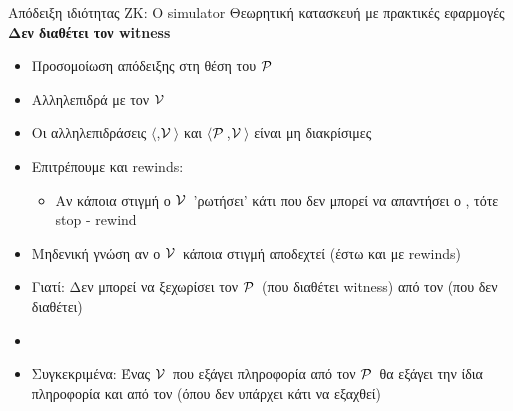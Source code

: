 \documentclass[10pt,handout]{beamer}
\begin{document}
\begin{frame}{Απόδειξη ιδιότητας ΖΚ: Ο simulator}
{Θεωρητική κατασκευή με πρακτικές εφαρμογές}
\textbf{Δεν διαθέτει τον witness}
\pause
\begin{small}
\begin{itemize}
\setlength\itemsep{0.01em}
\item Προσομοίωση απόδειξης στη θέση του $\mathcal{P}\,$ 
\item Αλληλεπιδρά με τον $\mathcal{V}\,$
\pause
\item Οι αλληλεπιδράσεις $\langle$\siml,$\mathcal{V}\,$$\rangle$ και $\langle$$\mathcal{P}\,$,$\mathcal{V}\,$$\rangle$ είναι μη διακρίσιμες
\pause
\item Επιτρέπουμε και rewinds:
\pause
\begin{itemize}
\item Αν κάποια στιγμή ο $\mathcal{V}\,$ 'ρωτήσει' κάτι που δεν μπορεί να απαντήσει ο \siml, τότε stop - rewind

\end{itemize}
\pause
\item Μηδενική γνώση αν ο $\mathcal{V}\,$ κάποια στιγμή αποδεχτεί (έστω και με rewinds)
\pause
\item Γιατί: \pause
Δεν μπορεί να ξεχωρίσει τον $\mathcal{P}\,$ (που διαθέτει witness) από τον \siml (που δεν διαθέτει) 
\pause
\item {}
\pause
\item Συγκεκριμένα: Ένας $\mathcal{V}\,$ που εξάγει πληροφορία από τον $\mathcal{P}\,$ θα εξάγει την ίδια πληροφορία και από τον \siml (όπου δεν υπάρχει κάτι να εξαχθεί)

\end{itemize}
\end{small}
\end{frame}
\end{document}
